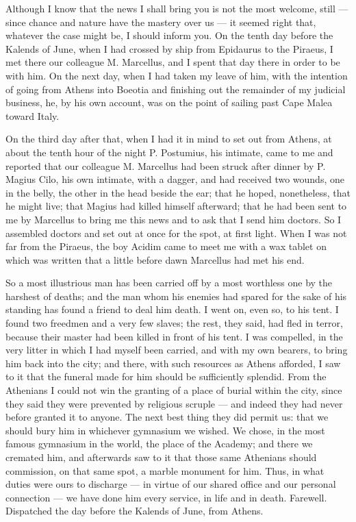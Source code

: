 

 Although I know that the news I shall bring you is not the most welcome, still --- since chance and nature have the mastery over us --- it seemed right that, whatever the case might be, I should inform you. On the tenth day before the Kalends of June, when I had crossed by ship from Epidaurus to the Piraeus, I met there our colleague M. Marcellus, and I spent that day there in order to be with him. On the next day, when I had taken my leave of him, with the intention of going from Athens into Boeotia and finishing out the remainder of my judicial business, he, by his own account, was on the point of sailing past Cape Malea toward Italy.

 On the third day after that, when I had it in mind to set out from Athens, at about the tenth hour of the night P. Postumius, his intimate, came to me and reported that our colleague M. Marcellus had been struck after dinner by P. Magius Cilo, his own intimate, with a dagger, and had received two wounds, one in the belly, the other in the head beside the ear; that he hoped, nonetheless, that he might live; that Magius had killed himself afterward; that he had been sent to me by Marcellus to bring me this news and to ask that I send him doctors. So I assembled doctors and set out at once for the spot, at first light. When I was not far from the Piraeus, the boy Acidim came to meet me with a wax tablet on which was written that a little before dawn Marcellus had met his end.

 So a most illustrious man has been carried off by a most worthless one by the harshest of deaths; and the man whom his enemies had spared for the sake of his standing has found a friend to deal him death. I went on, even so, to his tent. I found two freedmen and a very few slaves; the rest, they said, had fled in terror, because their master had been killed in front of his tent. I was compelled, in the very litter in which I had myself been carried, and with my own bearers, to bring him back into the city; and there, with such resources as Athens afforded, I saw to it that the funeral made for him should be sufficiently splendid. From the Athenians I could not win the granting of a place of burial within the city, since they said they were prevented by religious scruple --- and indeed they had never before granted it to anyone. The next best thing they did permit us: that we should bury him in whichever gymnasium we wished. We chose, in the most famous gymnasium in the world, the place of the Academy; and there we cremated him, and afterwards saw to it that those same Athenians should commission, on that same spot, a marble monument for him. Thus, in what duties were ours to discharge --- in virtue of our shared office and our personal connection --- we have done him every service, in life and in death. Farewell. Dispatched the day before the Kalends of June, from Athens.
